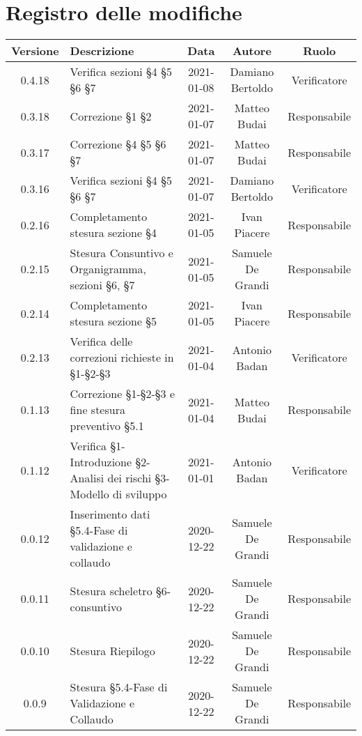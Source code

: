 \section*{Registro delle modifiche}

\begin{center}
	\begin{longtable}{|c|p{5cm}|c|c|c|}
	\hline
	\rowcolor{lighter-grayer}
	\textbf{Versione} & \textbf{Descrizione} & \textbf{Data} & \textbf{Autore} & \textbf{Ruolo} \\
	\hline
	\endfirsthead

	0.4.18 & Verifica sezioni §4 §5 §6 §7 & 2021-01-08 & Damiano Bertoldo & Verificatore \\
	\hline
	0.3.18 & Correzione §1 §2 & 2021-01-07 & Matteo Budai & Responsabile \\
	\hline
	0.3.17 & Correzione §4 §5 §6 §7 & 2021-01-07 & Matteo Budai & Responsabile \\
	\hline
	0.3.16 & Verifica sezioni §4 §5 §6 §7 & 2021-01-07 & Damiano Bertoldo & Verificatore \\
	\hline
	0.2.16 & Completamento stesura sezione §4 & 2021-01-05 & Ivan Piacere & Responsabile \\
	\hline
	0.2.15 & Stesura Consuntivo e Organigramma, sezioni §6, §7 & 2021-01-05 & Samuele De Grandi & Responsabile \\
	\hline
	0.2.14 & Completamento stesura sezione §5 & 2021-01-05 & Ivan Piacere & Responsabile \\
	\hline
	0.2.13 & Verifica delle correzioni richieste in §1-§2-§3 & 2021-01-04 & Antonio Badan & Verificatore \\
	\hline
	0.1.13 & Correzione §1-§2-§3 e fine stesura preventivo §5.1 & 2021-01-04 & Matteo Budai & Responsabile \\
	\hline
	0.1.12 & Verifica §1-Introduzione §2-Analisi dei rischi §3-Modello di sviluppo & 2021-01-01 & Antonio Badan & Verificatore \\
	\hline
	0.0.12 & Inserimento dati §5.4-Fase di validazione e collaudo & 2020-12-22 & Samuele De Grandi & Responsabile \\
	\hline
	0.0.11 & Stesura scheletro §6-consuntivo & 2020-12-22 & Samuele De Grandi & Responsabile \\
	\hline
	0.0.10 & Stesura Riepilogo & 2020-12-22 & Samuele De Grandi & Responsabile \\
	\hline
	0.0.9 & Stesura §5.4-Fase di Validazione e Collaudo & 2020-12-22 & Samuele De Grandi & Responsabile \\

\end{longtable}
\end{center}
